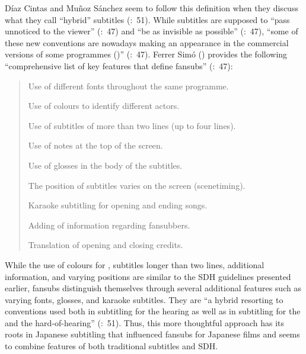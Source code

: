 Díaz Cintas and Muñoz Sánchez seem to follow this definition when they discuss what they call “hybrid” subtitles (\citeyear{Diaz_cintas2006}:~51). While subtitles are supposed to “pass unnoticed to the viewer” (\citeyear{Diaz_cintas2006}:~47) and “be as invisible as possible” (\citeyear{Diaz_cintas2006}:~47), “some of these new conventions are nowadays making an appearance in the commercial versions of some programmes (\citealt{Diaz_cintas2005})” (\citeyear{Diaz_cintas2006}:~47). Ferrer Simó (\citeyear{Ferrer_simo2005}) provides the following “comprehensive list of key features that define fansubs” (\citeyear{Diaz_cintas2006}:~47):
\begin{quote}
Use of different fonts throughout the same programme.

Use of colours to identify different actors.

Use of subtitles of more than two lines (up to four lines).

Use of notes at the top of the screen.

Use of glosses in the body of the subtitles.

The position of subtitles varies on the screen (scenetiming).

Karaoke subtitling for opening and ending songs.

Adding of information regarding fansubbers.

Translation of opening and closing credits.
\end{quote}
While the use of colours for , subtitles longer than two lines, additional information, and varying positions are similar to the SDH guidelines presented earlier, fansubs distinguish themselves through several additional features such as varying fonts, glosses, and karaoke subtitles. They are “a hybrid resorting to conventions used both in subtitling for the hearing as well as in subtitling for the  and the hard-of-hearing” (\citeyear{Diaz_cintas2006}:~51). Thus, this more thoughtful approach has its roots in Japanese subtitling that influenced fansubs for Japanese  films and seems to combine features of both traditional subtitles and SDH.

